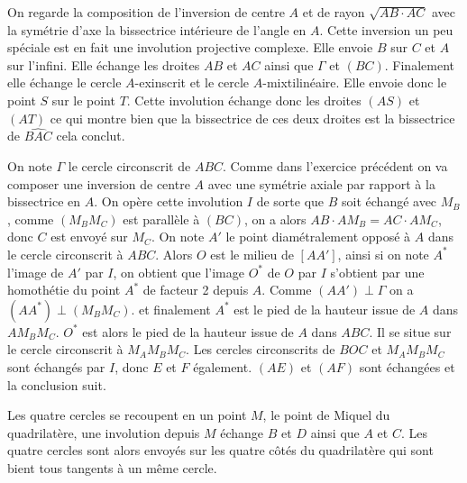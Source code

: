 \begin{sol}

On regarde la composition de l'inversion de centre $A$ et de rayon $\sqrt{AB \cdot AC}$ avec la symétrie d'axe la bissectrice intérieure de l'angle en $A$. Cette inversion un peu spéciale est en fait une involution projective complexe. Elle envoie $B$ sur $C$ et $A$ sur l'infini. Elle échange les droites $AB$ et $AC$ ainsi que $\Gamma$ et $(BC)$. Finalement elle échange le cercle $A$-exinscrit et le cercle $A$-mixtilinéaire. Elle envoie donc le point $S$ sur le point $T$. Cette involution échange donc les droites $(AS)$ et $(AT)$ ce qui montre bien que la bissectrice de ces deux droites est la bissectrice de $\widehat{BAC}$ cela conclut.
\end{sol}

\begin{sol}

On note $\Gamma$ le cercle circonscrit de $ABC$.
Comme dans l'exercice précédent on va composer une inversion de centre $A$ avec une symétrie axiale par rapport à la bissectrice en $A$. On opère cette involution $I$ de sorte que $B$ soit échangé avec $M_B$, comme $(M_BM_C)$ est parallèle à $(BC)$, on a alors $AB\cdot AM_B=AC \cdot AM_C$, donc $C$ est envoyé sur $M_C$.
On note $A'$ le point diamétralement opposé à $A$ dans le cercle circonscrit à $ABC$. Alors $O$ est le milieu de $[AA']$, ainsi si on note $A^*$ l'image de $A'$ par $I$, on obtient que l'image $O^*$ de $O$ par $I$ s'obtient par une homothétie du point $A^*$ de facteur 2 depuis $A$. Comme $(AA')\perp \Gamma$ on a $(AA^*)\perp (M_BM_C)$. et finalement $A^*$ est le pied de la hauteur issue de $A$ dans $AM_BM_C$. $O^*$ est alors le pied de la hauteur issue de $A$ dans $ABC$. Il se situe sur le cercle circonscrit à $M_AM_BM_C$. Les cercles circonscrits de $BOC$ et $M_AM_BM_C$ sont échangés par $I$, donc $E$ et $F$ également. $(AE)$ et $(AF)$ sont échangées et la conclusion suit.
\end{sol}

\begin{sol}

Les quatre cercles se recoupent en un point $M$, le point de Miquel du quadrilatère, une involution depuis $M$ échange $B$ et $D$ ainsi que $A$ et $C$. Les quatre cercles sont alors envoyés sur les quatre côtés du quadrilatère qui sont bient tous tangents à un même cercle.
\end{sol}

